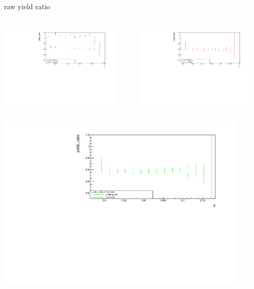 \begin{frame}{raw yield ratio}
\begin{columns}
\begin{column}[T]{0.5\textwidth}
\includegraphics[width = 0.9\textwidth]{results/yield/statistics/x_Q2_z_0.55_4.764_0.40_ratio.pdf}
\end{column}
\begin{column}[T]{0.5\textwidth}
\includegraphics[width = 0.9\textwidth]{results/yield/statistics/x_Q2_z_0.55_4.764_0.50_ratio.pdf}
\end{column}
\end{columns}
\begin{columns}
\begin{column}[T]{0.5\textwidth}
\includegraphics[width = 0.9\textwidth]{results/yield/statistics/x_Q2_z_0.55_4.764_0.60_ratio.pdf}

\end{column}
\end{columns}
\end{frame}
